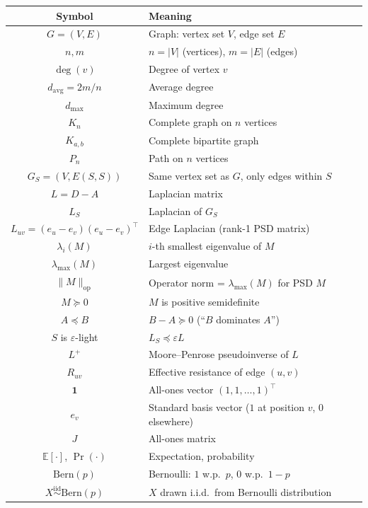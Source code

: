 \documentclass[12pt]{article}
\theoremstyle{definition}
\theoremstyle{remark}
\begin{document}
\begin{center}
\renewcommand{\arraystretch}{1.4}
\begin{tabular}{|c|p{10cm}|}
\hline
\textbf{Symbol} & \textbf{Meaning} \\
\hline
$G = (V,E)$ & Graph: vertex set $V$, edge set $E$ \\
$n, m$ & $n = |V|$ (vertices), $m = |E|$ (edges) \\
$\deg(v)$ & Degree of vertex $v$ \\
$d_{\mathrm{avg}} = 2m/n$ & Average degree \\
$d_{\max}$ & Maximum degree \\
$K_n$ & Complete graph on $n$ vertices \\
$K_{a,b}$ & Complete bipartite graph \\
$P_n$ & Path on $n$ vertices \\
$G_S = (V, E(S,S))$ & Same vertex set as $G$, only edges within $S$ \\
$L = D - A$ & Laplacian matrix \\
$L_S$ & Laplacian of $G_S$ \\
$L_{uv} = (e_u-e_v)(e_u-e_v)^\top$ & Edge Laplacian (rank-1 PSD matrix) \\
$\lambda_i(M)$ & $i$-th smallest eigenvalue of $M$ \\
$\lambda_{\max}(M)$ & Largest eigenvalue \\
$\|M\|_{\mathrm{op}}$ & Operator norm = $\lambda_{\max}(M)$ for PSD $M$ \\
$M \succeq 0$ & $M$ is positive semidefinite \\
$A \preceq B$ & $B - A \succeq 0$ (``$B$ dominates $A$'') \\
$S$ is $\varepsilon$-light & $L_S \preceq \varepsilon L$ \\
$L^+$ & Moore--Penrose pseudoinverse of $L$ \\
$R_{uv}$ & Effective resistance of edge $(u,v)$ \\
$\mathbf{1}$ & All-ones vector $(1,1,\ldots,1)^\top$ \\
$e_v$ & Standard basis vector ($1$ at position $v$, $0$ elsewhere) \\
$J$ & All-ones matrix \\
$\mathbb{E}[\cdot]$, $\Pr(\cdot)$ & Expectation, probability \\
$\mathrm{Bern}(p)$ & Bernoulli: $1$ w.p.\ $p$, $0$ w.p.\ $1-p$ \\
$X \overset{\mathrm{iid}}{\sim} \mathrm{Bern}(p)$ & $X$ drawn i.i.d.\ from Bernoulli distribution \\
\hline
\end{tabular}
\end{center}
\end{document}
